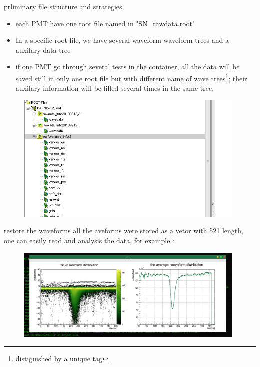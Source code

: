 \begin{frame}{prliminary file structure and strategies}
\begin{itemize}
\item each PMT have one root file named in "SN\_rawdata.root"
\item In a specific root file, we have several waveform waveform trees and a auxilary data tree
\item if one PMT go through several tests in the container, all the data will be saved still in only one root file but with different name of wave trees\footnote{distiguished by a unique tag}; their auxilary information will be filled several times in the same tree. 
\end{itemize}
\begin{figure}
\centering
\includegraphics[width=0.98\textwidth]{figures/tree.png} %
\end{figure}

\end{frame}
\begin{frame}{ restore the waveforms}
all the aveforms were stored as a vetor with 521 length, one can easily read and analysis the data, for example : 
\begin{figure}
\centering
\includegraphics[width=0.98\textwidth]{figures/exam.png} %
\end{figure}

\end{frame}
